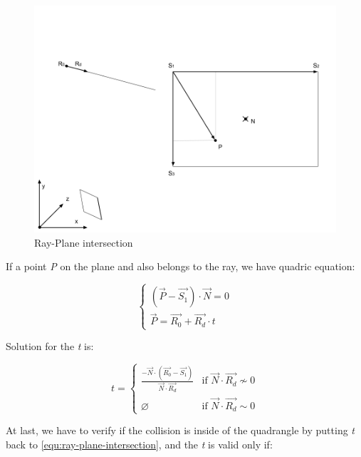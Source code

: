 \begin{figure}[H]\label{fig:ray-plane}
\centering
\includegraphics[width=\linewidth]{Figures/ray-plane-intersection.png}
\decoRule
\caption[ray-plane-intersection]{Ray-Plane intersection}
\end{figure}

If a point \emph{P} on the plane and also belongs to the ray, we have quadric equation:

\begin{equation}\label{equ:ray-plane-intersection}
\left\{
\begin{array}{lr}
(\overrightarrow{P} - \overrightarrow{S_1}) \cdot \overrightarrow{N} = 0 \\
\overrightarrow{P} = \overrightarrow{R_0} + \overrightarrow{R_d} \cdot t
\end{array}
\right.
\end{equation}

Solution for the \emph{t} is:

\[
t =
\begin{cases}
\frac{-\overrightarrow{N} \cdot (\overrightarrow{R_0} - \overrightarrow{S_1})}{\overrightarrow{N} \cdot \overrightarrow{R_d}} & \text{if } \overrightarrow{N} \cdot \overrightarrow{R_d} \nsim 0 \\
\varnothing & \text{if } \overrightarrow{N} \cdot \overrightarrow{R_d} \sim 0
\end{cases}
\]

At last, we have to verify if the collision is inside of the quadrangle by putting \emph{t} back to \ref{equ:ray-plane-intersection}, and the \emph{t} is valid only if:

